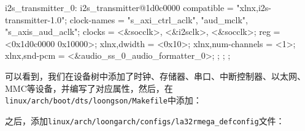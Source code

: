 \begin{CodeBlock}[language=BookDTS]
{{        i2s_transmitter_0: i2s_transmitter@1d0c0000 {
            compatible = "xlnx,i2s-transmitter-1.0";
            clock-names = "s_axi_ctrl_aclk", "aud_mclk", "s_axis_aud_aclk";
            clocks = <&socclk>, <&i2sclk>, <&socclk>;
            reg = <0x1d0c0000 0x10000>;
            xlnx,dwidth = <0x10>;
            xlnx,num-channels = <1>;
            xlnx,snd-pcm = <&audio_ss_0_audio_formatter_0>;
        };
    };
};
\end{CodeBlock}

可以看到，我们在设备树中添加了时钟、存储器、串口、中断控制器、以太网、MMC等设备，并编写了对应属性，然后，在\texttt{linux/arch/boot/dts/loongson/Makefile}中添加：


之后，添加\texttt{linux/arch/loongarch/configs/la32rmega\_defconfig}文件：

